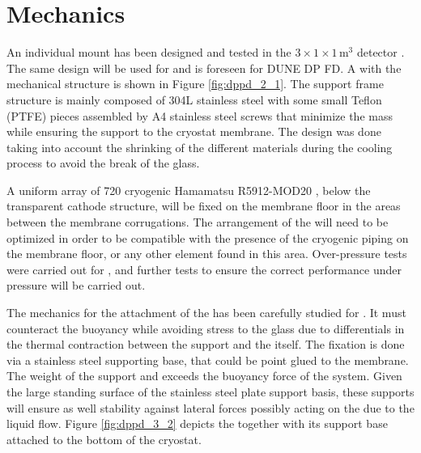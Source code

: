 \section{Mechanics}
\label{sec:fddp-pd-3}


An individual  mount has been designed and tested in the   $3\times1\times1$\,m$^3$ detector \cite{Zambelli:2017dkg}. The same design will be used for  and is foreseen for DUNE DP FD. A  with the mechanical structure is shown in Figure \ref{fig:dppd_2_1}. The support frame structure is mainly composed of \num{304}L stainless steel with some small Teflon (PTFE) pieces assembled by A4 stainless steel screws that minimize the mass while ensuring the  support to the cryostat membrane. The design was done taking into account the shrinking of the different materials during the cooling process to avoid the break of the  glass.


A uniform array of \num{720} cryogenic Hamamatsu R5912-MOD20 , below the transparent cathode structure, will be fixed on the membrane floor in the areas between the membrane corrugations. The arrangement of the  will need to be optimized in order to be compatible with the presence of the cryogenic piping on the membrane floor, or any other element found in this area. Over-pressure tests were carried out for , and further tests to ensure the correct performance under pressure will be carried out.

The mechanics for the attachment of the  has been carefully studied for . It must counteract the  buoyancy while avoiding stress to the  glass due to differentials in the thermal contraction between the support and the  itself. The fixation is done via a stainless steel supporting base, that could be point glued to the membrane. The weight of the support and  exceeds the buoyancy force of the system. Given the large standing surface of the stainless steel plate support basis, these supports will ensure as well stability against lateral forces possibly acting on the  due to the liquid flow. Figure \ref{fig:dppd_3_2} depicts the  together with its support base attached to the bottom of the cryostat.

